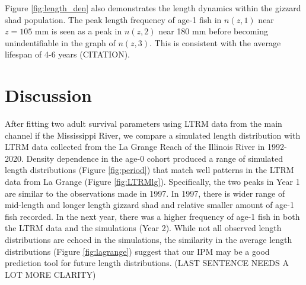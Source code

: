 \documentclass[preprint,review,12pt,authoryear]{elsarticle}
\begin{document}
Figure \ref{fig:length_den} also demonstrates the length dynamics within the gizzard shad population.  
The peak length frequency of age-1 fish in $n(z,1)$ near $z = 105$ mm is seen as a peak in $n(z,2)$ near 180 mm before becoming unindentifiable in the graph of $n(z,3)$.  
This is consistent with the average lifespan of 4-6 years (CITATION). 


\section{Discussion}


After fitting two adult survival parameters using LTRM data from the main channel if the Mississippi River, we compare a simulated length distribution with LTRM data collected from the La Grange Reach of the Illinois River in 1992-2020. 
Density dependence in the age-0 cohort produced a range of simulated length distributions (Figure \ref{fig:period}) that match well patterns in the LTRM data from La Grange (Figure \ref{fig:LTRMlg}). 
Specifically, the two peaks in Year 1 are similar to the observations made in 1997.  
In 1997, there is wider range of mid-length and longer length gizzard shad and relative smaller amount of age-1 fish recorded.  
In the next year, there was a higher frequency of age-1 fish in both the LTRM data and the simulations (Year 2).
While not all observed length distributions are echoed in the simulations, the similarity in the average length distributions (Figure \ref{fig:lagrange}) suggest that our IPM may be a good prediction tool for future length distributions.  (LAST SENTENCE NEEDS A LOT MORE CLARITY)
\end{document}
